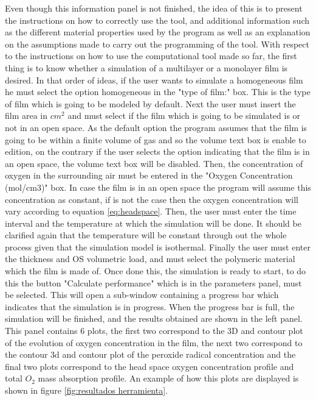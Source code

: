 Even though this information panel is not finished, the idea of this is to present the instructions on how to correctly use the tool,  and additional information such as the different material properties used by the program as well as an explanation on the assumptions made to carry out the programming of the tool. With respect to the instructions on how to use the computational tool made so far, the first thing is to know whether a simulation of a multilayer or a monolayer film is desired. In that order of ideas, if the user wants to simulate a homogeneous film he must select the option homogeneous in the "type of film:" box. This is the type of film which is  going to be modeled by default. Next the user must insert the film area in $cm^2$ and must select if the film which is going to be simulated is or not in an open space. As the default option the program assumes that the film is going to be within a finite volume of gas and so the volume text box is enable to edition, on the contrary if the user selects the option indicating that the film is in an open space, the volume text box will be disabled. Then, the concentration of oxygen in the surrounding air must be entered in the "Oxygen Concentration (mol/cm3)" box. In case the film is in an open space the program will assume this concentration as constant, if is not the case then the oxygen concentration will vary according to equation  \ref{eq:headspace}. Then, the user must enter the time interval and the temperature at which the simulation will be done. It should be clarified again that the temperature will be constant through out the whole process given that the simulation model is isothermal. Finally the user must enter the thickness and OS volumetric load, and must select the polymeric material which the film is made of. Once done this, the simulation is ready to start, to do this the button "Calculate performance" which is in the parameters panel, must be selected. This will open a sub-window containing a progress bar which indicates that the simulation is in progress. When the progress bar is full, the simulation will be finished, and the results obtained are shown in the left panel. This panel contains 6 plots, the first two correspond to the 3D and contour plot of the evolution of oxygen concentration in the film, the next two correspond to the contour 3d and contour plot of the peroxide radical concentration and the final two plots correspond to the head space oxygen concentration profile and total $O_2$ mass absorption profile. An example of how this plots are displayed is shown in figure \ref{fig:resultados herramienta}. 

